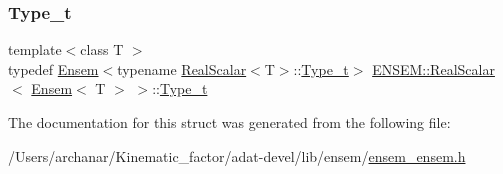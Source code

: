 \subsubsection{\texorpdfstring{Type\_t}{Type\_t}\hspace{0.1cm}{\footnotesize\ttfamily [3/3]}}
{\footnotesize\ttfamily template$<$class T $>$ \\
typedef \mbox{\hyperlink{classENSEM_1_1Ensem}{Ensem}}$<$typename \mbox{\hyperlink{structENSEM_1_1RealScalar}{Real\+Scalar}}$<$T$>$\+::\mbox{\hyperlink{structENSEM_1_1RealScalar_3_01Ensem_3_01T_01_4_01_4_a7822ecdfc2f8d6c24460263831283db8}{Type\+\_\+t}}$>$ \mbox{\hyperlink{structENSEM_1_1RealScalar}{E\+N\+S\+E\+M\+::\+Real\+Scalar}}$<$ \mbox{\hyperlink{classENSEM_1_1Ensem}{Ensem}}$<$ T $>$ $>$\+::\mbox{\hyperlink{structENSEM_1_1RealScalar_3_01Ensem_3_01T_01_4_01_4_a7822ecdfc2f8d6c24460263831283db8}{Type\+\_\+t}}}



The documentation for this struct was generated from the following file\+:\begin{DoxyCompactItemize}
\item 
/\+Users/archanar/\+Kinematic\+\_\+factor/adat-\/devel/lib/ensem/\mbox{\hyperlink{adat-devel_2lib_2ensem_2ensem__ensem_8h}{ensem\+\_\+ensem.\+h}}\end{DoxyCompactItemize}
